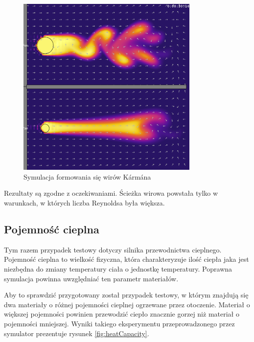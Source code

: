 \begin{figure}[!h]
\centering
\includegraphics[width=0.8\textwidth]{img/physics/karman}
\caption{Symulacja formowania się wirów Kármána}
\label{fig:physKarman}
\end{figure}

Rezultaty są zgodne z oczekiwaniami. Ścieżka wirowa powstała tylko w warunkach, w których
liczba Reynoldsa była większa.

\subsection{Pojemność cieplna}

Tym razem przypadek testowy dotyczy silnika przewodnictwa cieplnego. Pojemność
cieplna to wielkość fizyczna, która charakteryzuje ilość ciepła jaka jest
niezbędna do zmiany temperatury ciała o jednostkę temperatury. Poprawna
symulacja powinna uwzględniać ten parametr materiałów.

Aby to sprawdzić przygotowany został przypadek testowy, w którym znajdują się
dwa materiały o różnej pojemności cieplnej ogrzewane przez otoczenie. Materiał
o większej pojemności powinien przewodzić ciepło znacznie gorzej niż materiał
o pojemności mniejszej. Wyniki takiego eksperymentu przeprowadzonego przez
symulator \en prezentuje rysunek \ref{fig:heatCapacity}.

\clearpage 

